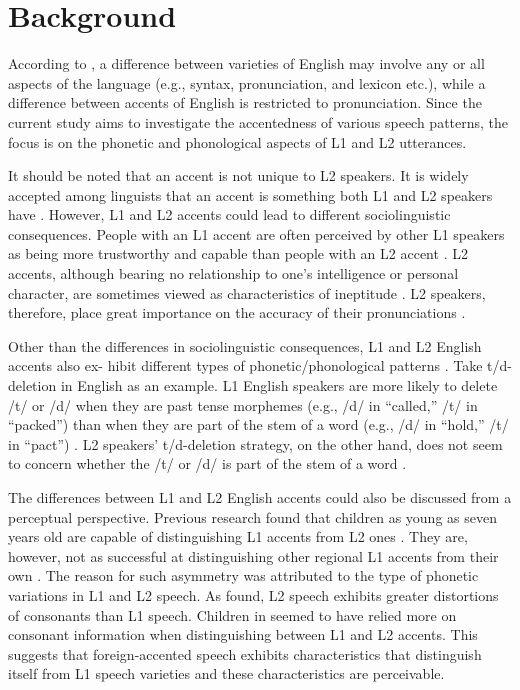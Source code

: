 \section{Background}

According to \citet{Wells_1982}, a difference between varieties of English may involve any or all aspects of the language (e.g., syntax, pronunciation, and lexicon etc.), while a difference between accents of English is restricted to pronunciation. Since the current study aims to investigate the accentedness of various speech patterns, the focus is on the phonetic and phonological aspects of L1 and L2 utterances. 

It should be noted that an accent is not unique to L2 speakers. It is widely accepted among linguists that an accent is something both L1 and L2 speakers have \citep{Lippi-Green_2012}. However, L1 and L2 accents could lead to different sociolinguistic consequences. People with an L1 accent are often perceived by other L1 speakers as being more trustworthy and capable than people with an L2 accent \citep{Gluszek_2010}. L2 accents, although bearing no relationship to one’s intelligence or personal character, are sometimes viewed as characteristics of ineptitude \citep{Gluszek_2010}. L2 speakers, therefore, place great importance on the accuracy of their pronunciations \citep{Waniek-Klimczak_2015}.

Other than the differences in sociolinguistic consequences, L1 and L2 English accents also ex- hibit different types of phonetic/phonological patterns \citep{Lippi-Green_2012}. Take t/d-deletion in English as an example. L1 English speakers are more likely to delete /t/ or /d/ when they are past tense morphemes (e.g., /d/ in “called,” /t/ in “packed”) than when they are part of the stem of a word (e.g., /d/ in “hold,” /t/ in “pact”) \citep{Guy_1991}. L2 speakers’ t/d-deletion strategy, on the other hand, does not seem to concern whether the   /t/ or /d/ is part of the stem of a word  \citep{Edwards_2011, Hansen_2004}.

 The differences between L1 and L2 English accents could also be discussed from a perceptual perspective. Previous research found that children as young as seven years old are capable of distinguishing L1 accents from L2 ones \citep{Floccia_2009}. They are, however, not as successful at distinguishing other regional L1 accents from their own \citep{Floccia_2009}. The reason for such asymmetry was attributed to the type of phonetic variations in L1 and L2 speech. As \citet{Floccia_2009} found, L2 speech exhibits greater distortions of consonants than L1 speech. Children in \citet {Floccia_2009} seemed to have relied more on consonant information when distinguishing between L1 and L2 accents. This suggests that foreign-accented speech exhibits characteristics that distinguish itself from L1 speech varieties and these characteristics are perceivable. 

